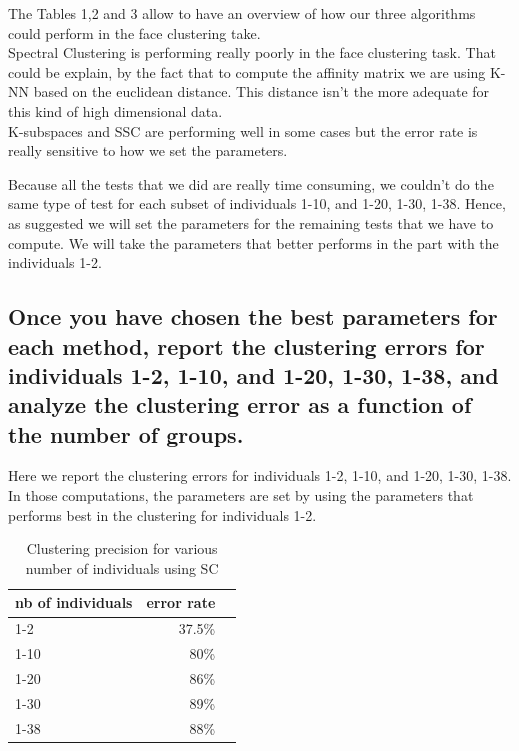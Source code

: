 \documentclass[12pt,a4paper,onecolumn]{article}
\begin{document}
The Tables 1,2 and 3 allow to have an overview of how our three algorithms could perform in the face clustering take. \\
Spectral Clustering is performing really poorly in the face clustering task. That could be explain, by the fact that to compute the affinity matrix we are using K-NN based on the euclidean distance. This distance isn't the more adequate for this kind of high dimensional data. \\
K-subspaces and SSC are performing well in some cases but the error rate is really sensitive to how we set the parameters.

Because all the tests that we did are really time consuming, we couldn't do the same type of test for each subset of individuals 1-10, and 1-20, 1-30, 1-38. Hence, as suggested we will set the parameters for the remaining tests that we have to compute. We will take the parameters that better performs in the part with the individuals 1-2.

\subsection{Once you have chosen the best parameters for each method, report the clustering errors for individuals 1-2, 1-10, and 1-20, 1-30, 1-38, and analyze the clustering error as a function of the number of groups.}

Here we report the clustering errors for individuals 1-2, 1-10, and 1-20, 1-30, 1-38. In those computations, the parameters are set by using the parameters that performs best in the clustering for individuals 1-2.

\begin{table}[H]
	\centering
	\begin{tabular}{l|r|r}
		\toprule
		{}    nb of individuals & error rate \\
		\midrule
		1-2                     & 37.5\%     \\
		1-10                    & 80\%       \\
		1-20                    & 86\%       \\
		1-30                    & 89\%       \\
		1-38                    & 88\%       \\
		\bottomrule
	\end{tabular}
	\caption{Clustering precision for various number of individuals using SC}
\end{table}
\end{document}
